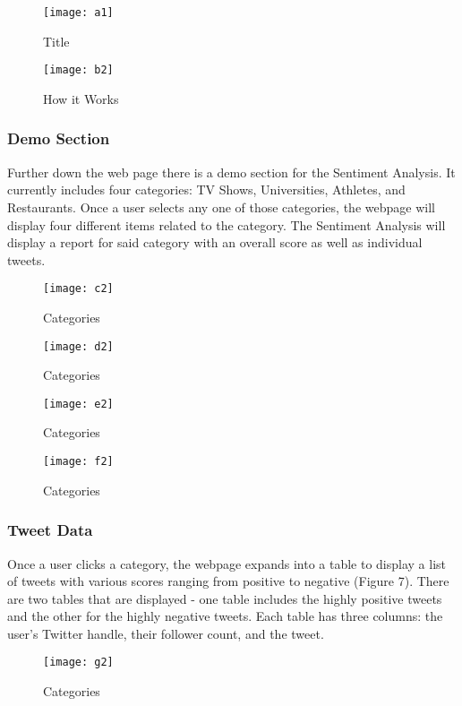 \documentclass[12pt, titlepage]{article}
\begin{document}
\begin{figure}[H]
\centering
\texttt{[image: a1]}
\caption{Title}
\label{fig:Result}
\end{figure}

\begin{figure}[H]
\centering
\texttt{[image: b2]}
\caption{How it Works}
\label{fig:Result}
\end{figure}

\subsubsection{Demo Section}
Further down the web page there is a demo section for the Sentiment Analysis. It currently includes four categories: TV Shows, Universities, Athletes, and Restaurants. Once a user selects any one of those categories, the webpage will display four different items related to the category. The Sentiment Analysis will display a report for said category with an overall score as well as individual tweets.

\begin{figure}[H]
\centering
\texttt{[image: c2]}
\caption{Categories}
\label{fig:Result}
\end{figure}

\begin{figure}[H]
\centering
\texttt{[image: d2]}
\caption{Categories}
\label{fig:Result}
\end{figure}

\begin{figure}[H]
\centering
\texttt{[image: e2]}
\caption{Categories}
\label{fig:Result}
\end{figure}

\begin{figure}[H]
\centering
\texttt{[image: f2]}
\caption{Categories}
\label{fig:Result}
\end{figure}



\subsubsection{Tweet Data}
Once a user clicks a category, the webpage expands into a table to display a list of tweets with various scores ranging from positive to negative (Figure 7). There are two tables that are displayed - one table includes the highly positive tweets and the other for the highly negative tweets. Each table has three columns: the user's Twitter handle, their follower count, and the tweet. 

\begin{figure}[H]
\centering
\texttt{[image: g2]}
\caption{Categories}
\label{fig:Result}
\end{figure}
\end{document}
